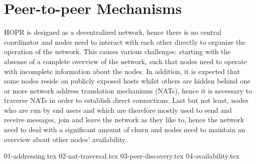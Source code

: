 \section{Peer-to-peer Mechanisms}
\label{sec:p2p}

HOPR is designed as a decentralized network, hence there is no central coordinator and nodes need to interact with each other directly to organize the operation of the network. This causes various challenges: starting with the absense of a complete overview of the network, such that nodes need to operate with incomplete information about the nodes. In addition, it is expected that some nodes reside on publicly exposed hosts whilst others are hidden behind one or more network address translation mechanisms (NATs), hence it is necessary to traverse NATs in order to establish direct connections. Last but not least, nodes who are run by end users and which are therefore mostly used to send and receive messages, join and leave the network as they like to, hence the network need to deal with a significant amount of churn and nodes need to maintain an overview about other nodes' availability.

{01-addressing.tex}
{02-nat-traversal.tex}
{03-peer-discovery.tex}
{04-availability.tex}
